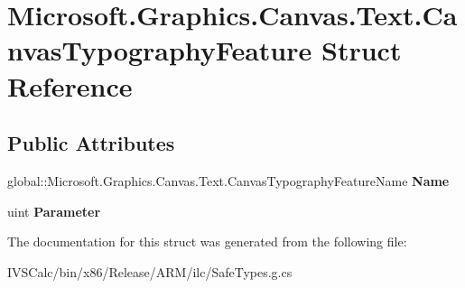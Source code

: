 \hypertarget{struct_microsoft_1_1_graphics_1_1_canvas_1_1_text_1_1_canvas_typography_feature}{}\section{Microsoft.\+Graphics.\+Canvas.\+Text.\+Canvas\+Typography\+Feature Struct Reference}
\label{struct_microsoft_1_1_graphics_1_1_canvas_1_1_text_1_1_canvas_typography_feature}
\subsection*{Public Attributes}
\begin{DoxyCompactItemize}
\item 
\mbox{\label{struct_microsoft_1_1_graphics_1_1_canvas_1_1_text_1_1_canvas_typography_feature_a7c2c7770fd2ce07deefb813f6400180f}} 
global\+::\+Microsoft.\+Graphics.\+Canvas.\+Text.\+Canvas\+Typography\+Feature\+Name {\bfseries Name}
\item 
\mbox{\label{struct_microsoft_1_1_graphics_1_1_canvas_1_1_text_1_1_canvas_typography_feature_a283547672675701ebdbca27c2bd12e1a}} 
uint {\bfseries Parameter}
\end{DoxyCompactItemize}


The documentation for this struct was generated from the following file\+:\begin{DoxyCompactItemize}
\item 
I\+V\+S\+Calc/bin/x86/\+Release/\+A\+R\+M/ilc/Safe\+Types.\+g.\+cs\end{DoxyCompactItemize}
